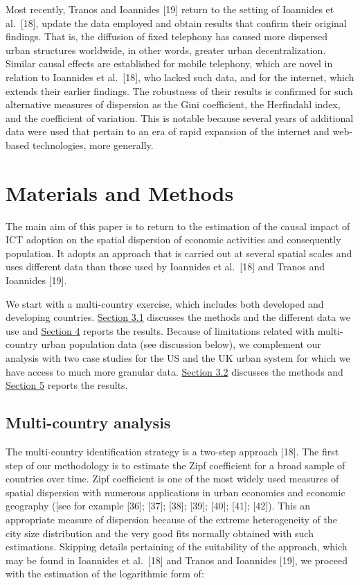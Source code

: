 \documentclass[10pt,letterpaper]{article}
\begin{document}
Most recently, Tranos and Ioannides {[}19{]} return to the setting of
Ioannides et al.~{[}18{]}, update the data employed and obtain results
that confirm their original findings. That is, the diffusion of fixed
telephony has caused more dispersed urban structures worldwide, in other
words, greater urban decentralization. Similar causal effects are
established for mobile telephony, which are novel in relation to
Ioannides et al.~{[}18{]}, who lacked such data, and for the internet,
which extends their earlier findings. The robustness of their results is
confirmed for such alternative measures of dispersion as the Gini
coefficient, the Herfindahl index, and the coefficient of variation.
This is notable because several years of additional data were used that
pertain to an era of rapid expansion of the internet and web-based
technologies, more generally.

\hypertarget{sec3}{%
\section{Materials and Methods}\label{sec3}}

The main aim of this paper is to return to the estimation of the causal
impact of ICT adoption on the spatial dispersion of economic activities
and consequently population. It adopts an approach that is carried out
at several spatial scales and uses different data than those used by
Ioannides et al.~{[}18{]} and Tranos and Ioannides {[}19{]}.

We start with a multi-country exercise, which includes both developed
and developing countries. \protect\hyperlink{sec3.1}{Section 3.1}
discusses the methods and the different data we use and
\protect\hyperlink{sec4}{Section 4} reports the results. Because of
limitations related with multi-country urban population data (see
discussion below), we complement our analysis with two case studies for
the US and the UK urban system for which we have access to much more
granular data. \protect\hyperlink{sec3.2}{Section 3.2} discusses the
methods and \protect\hyperlink{sec5}{Section 5} reports the results.

\hypertarget{sec3.1}{%
\subsection{Multi-country analysis}\label{sec3.1}}

The multi-country identification strategy is a two-step approach
{[}18{]}. The first step of our methodology is to estimate the Zipf
coefficient for a broad sample of countries over time. Zipf coefficient
is one of the most widely used measures of spatial dispersion with
numerous applications in urban economics and economic geography ({[}see
for example {[}36{]}; {[}37{]}; {[}38{]}; {[}39{]}; {[}40{]}; {[}41{]};
{[}42{]}). This an appropriate measure of dispersion because of the
extreme heterogeneity of the city size distribution and the very good
fits normally obtained with such estimations. Skipping details
pertaining of the suitability of the approach, which may be found in
Ioannides et al.~{[}18{]} and Tranos and Ioannides {[}19{]}, we proceed
with the estimation of the logarithmic form of:
\end{document}
